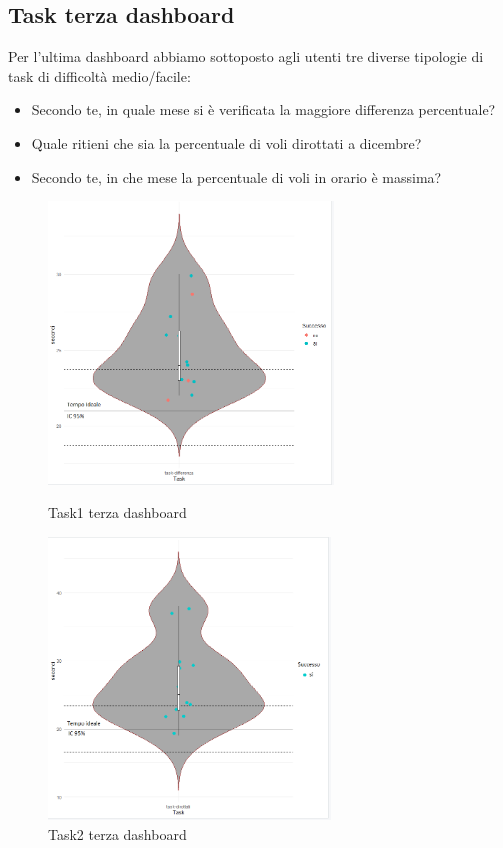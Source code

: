 \documentclass[12pt]{article}
\begin{document}
\subsection{Task terza dashboard}
Per l'ultima dashboard abbiamo sottoposto agli utenti tre diverse tipologie di task di difficoltà medio/facile:
\begin{itemize}
    \item Secondo te, in quale mese si è verificata la maggiore differenza percentuale?
    \item Quale ritieni che sia la percentuale di voli dirottati a dicembre?
    \item Secondo te, in che mese la percentuale di voli in orario è massima?
\end{itemize}
\begin{figure}[H]
	\begin{minipage}[b]{0.48\textwidth}
		\centering
		\includegraphics[width=\textwidth, height=7.5cm]{img/task/Dash3_TaskDifferenza.png}
        \caption{Task1 terza dashboard}
        \label{fig19}
	\end{minipage}
	\hfill
	\begin{minipage}[b]{0.48\textwidth}
		\centering
		\includegraphics[width=\textwidth, height=7.5cm]{img/task/Dash3_TaskDirottati.png}
        \caption{Task2 terza dashboard}
        \label{fig20}
	\end{minipage}
\end{figure}
\end{document}
